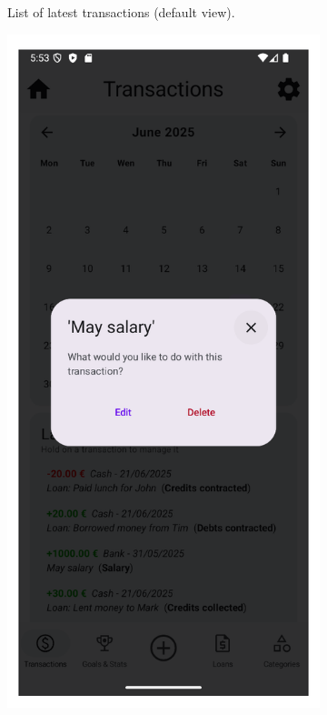 \documentclass[a4paper,12pt]{article}
\begin{document}
\begin{figure}[H]
\begin{subfigure}[b]{0.23\textwidth}
        \caption{List of latest transactions (default view).}
        \label{fig:transactions_latest}
    \end{subfigure}
    \hfill
    \begin{subfigure}[b]{0.23\textwidth}
        \includegraphics[width=\textwidth]{transactions_interaction_dialog.png}

\end{subfigure}
\end{figure}
\end{document}
